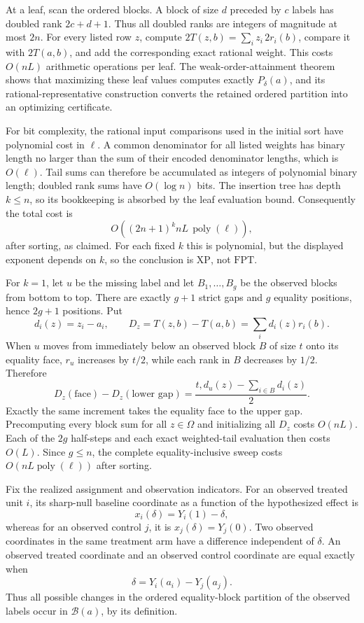 At a leaf, scan the ordered blocks.  A block of size \(d\) preceded by \(c\) labels has doubled rank \(2c+d+1\).  Thus all doubled ranks are integers of magnitude at most \(2n\).  For every listed row \(z\), compute \(2T(z,b)=\sum_i z_i\,2r_i(b)\), compare it with \(2T(a,b)\), and add the corresponding exact rational weight.  This costs \(O(nL)\) arithmetic operations per leaf.  The weak-order-attainment theorem shows that maximizing these leaf values computes exactly \(P_\delta(a)\), and its rational-representative construction converts the retained ordered partition into an optimizing certificate.

For bit complexity, the rational input comparisons used in the initial sort have polynomial cost in \(\ell\).  A common denominator for all listed weights has binary length no larger than the sum of their encoded denominator lengths, which is \(O(\ell)\).  Tail sums can therefore be accumulated as integers of polynomial binary length; doubled rank sums have \(O(\log n)\) bits.  The insertion tree has depth \(k\le n\), so its bookkeeping is absorbed by the leaf evaluation bound.  Consequently the total cost is
\[
O\!\left((2n+1)^k nL\,\operatorname{poly}(\ell)\right),
\]
after sorting, as claimed.  For each fixed \(k\) this is polynomial, but the displayed exponent depends on \(k\), so the conclusion is \(\mathrm{XP}\), not \(\mathrm{FPT}\).

For \(k=1\), let \(u\) be the missing label and let \(B_1,\ldots,B_g\) be the observed blocks from bottom to top.  There are exactly \(g+1\) strict gaps and \(g\) equality positions, hence \(2g+1\) positions.  Put
\[
d_i(z)=z_i-a_i,
\qquad
D_z= T(z,b)-T(a,b)=\sum_i d_i(z)r_i(b).
\]
When \(u\) moves from immediately below an observed block \(B\) of size \(t\) onto its equality face, \(r_u\) increases by \(t/2\), while each rank in \(B\) decreases by \(1/2\).  Therefore
\[
D_z(\text{face})-D_z(\text{lower gap})
=\frac{t,d_u(z)-\sum_{i\in B}d_i(z)}{2}.
\]
Exactly the same increment takes the equality face to the upper gap.  Precomputing every block sum for all \(z\in\Omega\) and initializing all \(D_z\) costs \(O(nL)\).  Each of the \(2g\) half-steps and each exact weighted-tail evaluation then costs \(O(L)\).  Since \(g\le n\), the complete equality-inclusive sweep costs \(O(nL\operatorname{poly}(\ell))\) after sorting.

Fix the realized assignment and observation indicators.  For an observed treated unit \(i\), its sharp-null baseline coordinate as a function of the hypothesized effect is
\[
x_i(\delta)=Y_i(1)-\delta,
\]
whereas for an observed control \(j\), it is \(x_j(\delta)=Y_j(0)\).  Two observed coordinates in the same treatment arm have a difference independent of \(\delta\).  An observed treated coordinate and an observed control coordinate are equal exactly when
\[
\delta=Y_i(a_i)-Y_j(a_j).
\]
Thus all possible changes in the ordered equality-block partition of the observed labels occur in \(\mathcal B(a)\), by its definition.

